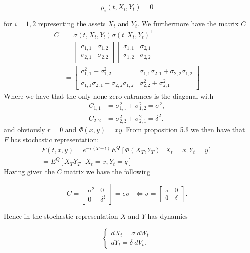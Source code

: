 \documentclass[a4paper,12pt,openany]{book}
\begin{document}
\[
\mu_i(t,X_t,Y_t)=0
\]

for \(i=1,2\) representing the assets \(X_t\) and \(Y_t\). We furthermore have the matrix \(C\)
\begin{align*}
C&=\sigma(t,X_t,Y_t)\sigma(t,X_t,Y_t)^\top\\
&=
\begin{bmatrix}
\sigma_{1,1} &\sigma_{1,2}\\
\sigma_{2,1}& \sigma_{2,2}
\end{bmatrix}\begin{bmatrix}
\sigma_{1,1} &\sigma_{2,1}\\
\sigma_{1,2}& \sigma_{2,2}
\end{bmatrix}\\
&=
\begin{bmatrix}
\sigma_{1,1}^2+\sigma_{1,2}^2 & \sigma_{1,1}\sigma_{2,1}+\sigma_{2,2}\sigma_{1,2}\\
\sigma_{1,1}\sigma_{2,1}+\sigma_{2,2}\sigma_{1,2} & \sigma_{2,2}^2+\sigma_{2,1}^2
\end{bmatrix}
\end{align*}
Where we have that the only none-zero entrances is the diagonal with
\begin{align*}
C_{1,1}&=\sigma_{1,1}^2+\sigma_{1,2}^2 = \sigma^2,\\
C_{2,2}&=\sigma_{2,2}^2+\sigma_{2,1}^2=\delta^2.
\end{align*}
and obviously \(r=0\) and \(\Phi(x,y)=xy\). From proposition 5.8 we then have that \(F\) has stochastic representation:
\begin{align*}
F(t,x,y)=e^{-r(T-t)}E^Q[\Phi(X_T,Y_T)\ \vert\ X_t=x,Y_t=y]\\
=E^Q[X_TY_T\ \vert\ X_t=x,Y_t=y]
\end{align*}
Having given the \(C\) matrix we have the following

\[
C=
\begin{bmatrix}
\sigma^2 & 0\\
0 & \delta^2
\end{bmatrix}=\sigma\sigma ^\top\iff\sigma =
\begin{bmatrix}
\sigma & 0\\
0 & \delta
\end{bmatrix}.
\]

Hence in the stochastic representation \(X\) and \(Y\) has dynamics

\[
\begin{cases}
dX_t=\sigma\ dW_t\\
dY_t=\delta\ dV_t.
\end{cases}
\]
\end{document}
